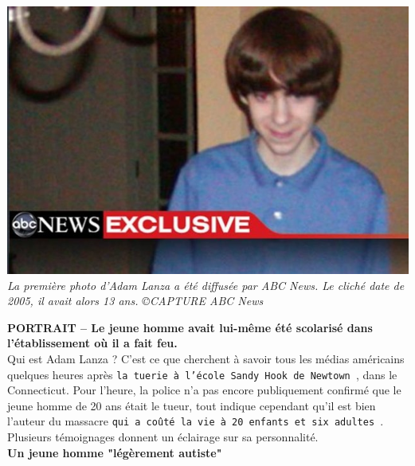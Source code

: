 \documentclass[11pt,twoside,a4paper]{article}
\begin{document}
\begin{minipage}[ht]{0.42\textwidth}
	\begin{center}
		\includegraphics[width=1.00\textwidth]{img/La-premiere-photo-d-Adam-Lanza-a-ete-diffusee-par-ABC-News-Le-cliche-date-de-2005-il-avait-alors-13-ans.jpg}
		\emph{\small La premi{\`e}re photo d'Adam Lanza a {\'e}t{\'e} diffus{\'e}e par ABC News. Le clich{\'e} date de 2005, il avait alors 13 ans. \copyright CAPTURE ABC News}~\\
	\end{center}
\end{minipage} \hfill \begin{minipage}[ht]{0.55\textwidth} 
	\textbf{PORTRAIT -- Le jeune homme avait lui-m{\^e}me {\'e}t{\'e} scolaris{\'e} dans l'{\'e}tablissement o{\`u} il a fait feu. }~\\

	Qui est Adam Lanza ? C'est ce que cherchent {\`a} savoir tous les m{\'e}dias am{\'e}ricains quelques heures apr{\`e}s \texttt{la tuerie {\`a} l'{\'e}cole Sandy Hook de Newtown~\footnotemark}, dans le Connecticut. Pour l'heure, la police n'a pas encore publiquement confirm{\'e} que le jeune homme de 20 ans {\'e}tait le tueur, tout indique cependant qu'il est bien l'auteur du massacre \texttt{qui a co{\^u}t{\'e} la vie {\`a} 20 enfants et six adultes~\footnotemark}. Plusieurs t{\'e}moignages donnent un {\'e}clairage sur sa personnalit{\'e}. ~\\
	
	\textbf{Un jeune homme "l{\'e}g{\`e}rement autiste"}~\\
\end{minipage}~\\~\\
\end{document}
